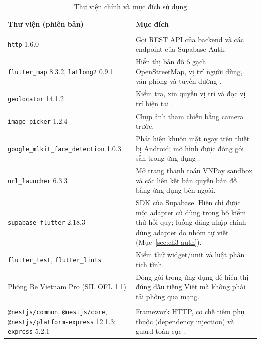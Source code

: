 \begin{table}[H]
	\centering
	\caption{Thư viện chính và mục đích sử dụng}
	\label{tab:ch3-libs}
	\footnotesize
	\begin{tabularx}{\textwidth}{@{}>{\raggedright\arraybackslash}p{5.6cm}X@{}}
		\toprule
		\textbf{Thư viện (phiên bản)} & \textbf{Mục đích}\\
		\midrule
		\multicolumn{2}{@{}l}{\textit{Ứng dụng Flutter (\texttt{app/\allowbreak{}pubspec.\allowbreak{}yaml})}}\\
		\texttt{http} 1.6.0 & Gọi REST API của backend và các endpoint của Supabase Auth.\\
		\texttt{flutter\_\allowbreak{}map} 8.3.2, \texttt{latlong2} 0.9.1 & Hiển thị bản đồ ô gạch OpenStreetMap, vị trí người dùng, văn phòng và tuyến đường \parencite{ch3-flutter-map}.\\
		\texttt{geolocator} 14.1.2 & Kiểm tra, xin quyền vị trí và đọc vị trí hiện tại \parencite{ch3-geolocator}.\\
		\texttt{image\_\allowbreak{}picker} 1.2.4 & Chụp ảnh tham chiếu bằng camera trước.\\
		\texttt{google\_mlkit\_\allowbreak face\_detection} 1.0.3 & Phát hiện khuôn mặt ngay trên thiết bị Android; mô hình được đóng gói sẵn trong ứng dụng \parencite{ch2-mlkit-face}.\\
		\texttt{url\_\allowbreak{}launcher} 6.3.3 & Mở trang thanh toán VNPay sandbox và các liên kết bản quyền bản đồ bằng ứng dụng bên ngoài.\\
		\texttt{supabase\_\allowbreak{}flutter} 2.18.3 & SDK của Supabase. Hiện chỉ được một adapter cũ dùng trong bộ kiểm thử hồi quy; luồng đăng nhập chính dùng adapter do nhóm tự viết (Mục~\ref{sec:ch3-auth}).\\
		\texttt{flutter\_\allowbreak{}test}, \texttt{flutter\_\allowbreak{}lints} & Kiểm thử widget/unit và luật phân tích tĩnh.\\
		Phông Be Vietnam Pro (SIL OFL 1.1) & Đóng gói trong ứng dụng để hiển thị đúng dấu tiếng Việt mà không phải tải phông qua mạng.\\
		\midrule
		\multicolumn{2}{@{}l}{\textit{Backend NestJS (\texttt{backend/\allowbreak{}package.\allowbreak{}json})}}\\
		\texttt{@nestjs/\allowbreak{}common}, \texttt{@nestjs/\allowbreak{}core}, \texttt{@nestjs/\allowbreak{}platform-\allowbreak{}express} 12.1.3; \texttt{express} 5.2.1 & Framework HTTP, cơ chế tiêm phụ thuộc (dependency injection) và guard toàn cục \parencite{ch2-nestjs-guards}.\\

\end{tabularx}
\end{table}
